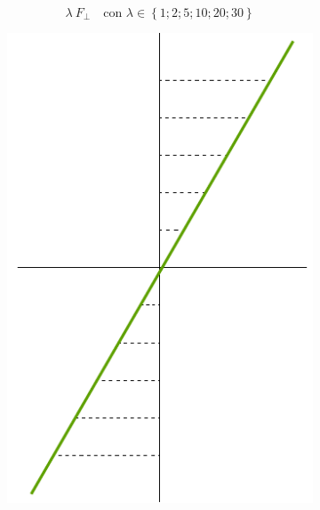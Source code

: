 \documentclass[a4paper,num-refs]{oup-contemporary}
\begin{document}
\begin{equation}
	\lambda \:F_{\perp} \quad \text{con } \lambda \in \left\{1; 2; 5;10;20;30\right\}
	\label{eq:Tload}
\end{equation}
\begin{figure}[bt!]
	\centering\captionsetup[subfigure]{justification=centering}
	\begin{subfigure}{0.25\linewidth}
		\includegraphics[width=\textwidth]{strain.pdf}
		\caption{}
	\end{subfigure}\hspace{0.1\linewidth}
	\begin{subfigure}{0.25\linewidth}

\end{subfigure}
\end{figure}
\end{document}
